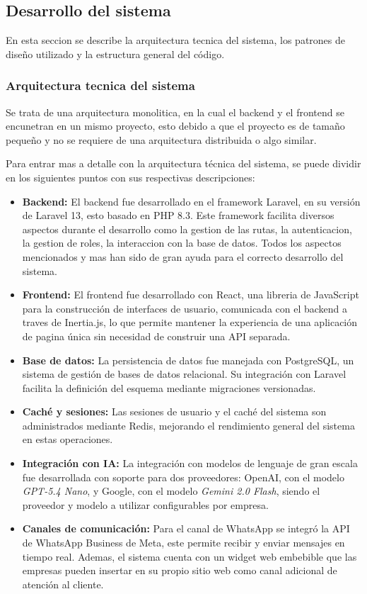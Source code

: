 \subsection{Desarrollo del sistema}
\label{sec:desarrollo_sistema}

En esta seccion se describe la arquitectura tecnica del sistema, los patrones de diseño utilizado y la estructura general del código.

\subsubsection{Arquitectura tecnica del sistema}
\label{subsec:arquitectura_tecnica_sistema}

Se trata de una arquitectura monolitica, en la cual el backend y el frontend se encunetran en un mismo proyecto, esto debido a que el proyecto es de tamaño pequeño y no se requiere de una arquitectura distribuida o algo similar.

Para entrar mas a detalle con la arquitectura técnica del sistema, se puede dividir en los siguientes puntos con sus respectivas descripciones:

\begin{itemize}
    \item \textbf{Backend:} El backend fue desarrollado en el framework Laravel, en su versión de Laravel 13, esto basado en PHP 8.3. Este framework facilita diversos aspectos durante el desarrollo como la gestion de las rutas, la autenticacion, la gestion de roles, la interaccion con la base de datos. Todos los aspectos mencionados y mas han sido de gran ayuda para el correcto desarrollo del sistema.
    \item \textbf{Frontend:} El frontend fue desarrollado con React, una libreria de JavaScript para la construcción de interfaces de usuario, comunicada con el backend a traves de Inertia.js, lo que permite mantener la experiencia de una aplicación de pagina única sin necesidad de construir una API separada. 
    \item \textbf{Base de datos:} La persistencia de datos fue manejada con PostgreSQL, un sistema de gestión de bases de datos relacional. Su integración con Laravel facilita la definición del esquema mediante migraciones versionadas.
    \item \textbf{Caché y sesiones:} Las sesiones de usuario y el caché del sistema son administrados mediante Redis, mejorando el rendimiento general del sistema en estas operaciones.
    \item \textbf{Integración con IA:} La integración con modelos de lenguaje de gran escala fue desarrollada con soporte para dos proveedores: OpenAI, con el modelo \textit{GPT-5.4 Nano}, y Google, con el modelo \textit{Gemini 2.0 Flash}, siendo el proveedor y modelo a utilizar configurables por empresa.
    \item \textbf{Canales de comunicación:} Para el canal de WhatsApp se integró la API de WhatsApp Business de Meta, este permite recibir y enviar mensajes en tiempo real. Ademas, el sistema cuenta con un widget web embebible que las empresas pueden insertar en su propio sitio web como canal adicional de atención al cliente.
\end{itemize}

